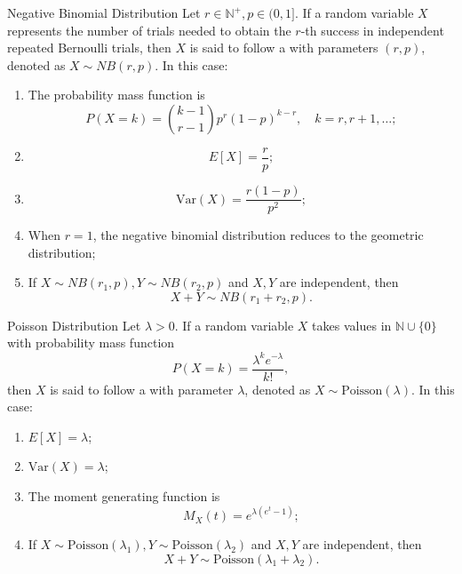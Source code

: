 \documentclass[../main.tex]{subfiles}
\begin{document}
\begin{proposition}{Negative Binomial Distribution}{}
Let $r \in \mathbb{N}^+, p \in (0,1]$. If a random variable $X$ represents the number of trials needed to obtain the $r$-th success in independent repeated Bernoulli trials, then $X$ is said to follow a  with parameters $(r,p)$, denoted as $X \sim NB(r,p)$. In this case:

\begin{enumerate}
\item The probability mass function is 
\[P(X=k) = \binom{k-1}{r-1}p^r(1-p)^{k-r}, \quad k=r,r+1,\ldots;\]

\item \[E[X] = \frac{r}{p};\]

\item \[\text{Var}(X) = \frac{r(1-p)}{p^2};\]

\item When $r=1$, the negative binomial distribution reduces to the geometric distribution;

\item If $X \sim NB(r_1,p), Y \sim NB(r_2,p)$ and $X,Y$ are independent, then 
\[X+Y \sim NB(r_1+r_2,p).\]
\end{enumerate}
\end{proposition}

\begin{proposition}{Poisson Distribution}{}
Let $\lambda > 0$. If a random variable $X$ takes values in $\mathbb{N} \cup \{0\}$ with probability mass function 
\[P(X=k) = \frac{\lambda^k e^{-\lambda}}{k!},\]
then $X$ is said to follow a  with parameter $\lambda$, denoted as $X \sim \text{Poisson}(\lambda)$. In this case:

\begin{enumerate}
\item $E[X] = \lambda$;

\item $\text{Var}(X) = \lambda$;

\item The moment generating function is 
\[M_X(t) = e^{\lambda(e^t-1)};\]

\item If $X \sim \text{Poisson}(\lambda_1), Y \sim \text{Poisson}(\lambda_2)$ and $X,Y$ are independent, then 
\[X+Y \sim \text{Poisson}(\lambda_1+\lambda_2).\]
\end{enumerate}
\end{proposition}
\end{document}

